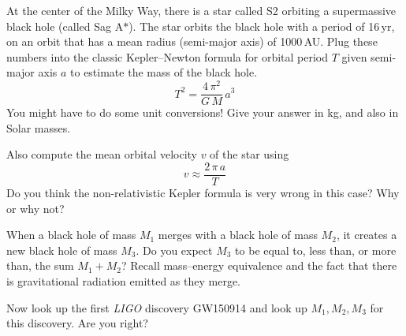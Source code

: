 \documentclass[12pt, letterpaper]{article}
\begin{document}
\begin{problem}
At the center of the Milky Way, there is a star called {\small S2}
orbiting a supermassive black hole (called Sag A$\ast$).
The star orbits the black hole with a period of 16\,yr, on an orbit
that has a mean radius (semi-major axis) of 1000\,AU.
Plug these numbers into the classic Kepler--Newton formula for orbital
period $T$ given semi-major axis $a$ to estimate the mass of the black
hole.
\begin{equation}
T^2 = \frac{4\,\pi^2}{G\,M}\,a^3
\end{equation}
You might have to do some unit conversions!
Give your answer in kg, and also in Solar masses.

Also compute the mean orbital velocity $v$ of the star using
\begin{equation}
v \approx \frac{2\,\pi\,a}{T}
\end{equation}
Do you think the non-relativistic Kepler formula is very wrong in this
case? Why or why not?
\end{problem}

\begin{problem}
When a black hole of mass $M_1$ merges with a black hole of mass $M_2$,
it creates a new black hole of mass $M_3$. Do you expect $M_3$ to be
equal to, less than, or more than, the sum $M_1 + M_2$? Recall mass--energy
equivalence and the fact that there is gravitational radiation emitted as
they merge.

Now look up the first \textsl{\small LIGO} discovery {\small GW150914} and
look up $M_1, M_2, M_3$ for this discovery. Are you right?
\end{problem}
\end{document}

